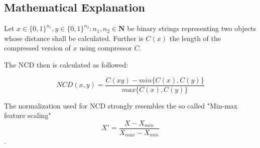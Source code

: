\subsection{Mathematical Explanation}

Let $x \in \{0,1\}^{n_{1}}, y \in \{0,1\}^{n_{2}} : n_{1}, n_{2} \in \mathbf{N}$ be binary strings representing two objects whose distance shall be calculated. Further is $C(x)$ the length of the compressed version of $x$ using compressor $C$.

The NCD then is calculated as followed:

$$ NCD(x,y) = \frac{C(xy) - min\{ C(x), C(y) \}}{max\{C(x), C(y) \}} $$



The normalization used for NCD strongly resembles the so called "Min-max feature scaling" $$X' = \frac{X - X_{min}}{X_{max} - X_{min}}$$.



